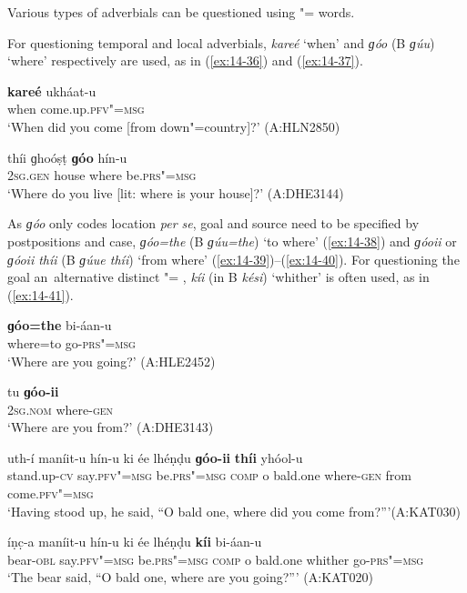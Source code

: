  Various types of adverbials can be questioned using "= words.


For questioning temporal and local adverbials, \textit{kareé} `when' and \textit{ɡóo} (B \textit{ɡúu}) `where' respectively are used, as in (\ref{ex:14-36}) and (\ref{ex:14-37}). 

\begin{exe}
\ex
\label{ex:14-36}
\gll \textbf{kareé} ukháat-u \\
when come.up.\textsc{pfv"=msg} \\
\glt `When did you come [from down"=country]?' (A:HLN2850)

\ex
\label{ex:14-37}
\gll thíi ɡhoóṣṭ \textbf{ɡóo} hín-u \\
\textsc{2sg.gen} house where be.\textsc{prs"=msg} \\
\glt `Where do you live [lit: where is your house]?' (A:DHE3144)
\end{exe}

As \textit{ɡóo} only codes location \textit{per se}, goal and source need to be specified by postpositions and case, \textit{ɡóo=the} (B \textit{ɡúu=the}) `to where' (\ref{ex:14-38}) and \textit{ɡóoii} or \textit{ɡóoii thíi} (B \textit{ɡúue thíi}) `from where' (\ref{ex:14-39})--(\ref{ex:14-40}). For questioning the goal an~alternative distinct "= , \textit{kíi} (in B \textit{kési}) `whither' is often used, as in (\ref{ex:14-41}).

\begin{exe}
\ex
\label{ex:14-38}
\gll \textbf{ɡóo=the} bi-áan-u \\
where=to go-\textsc{prs"=msg } \\
\glt `Where are you going?' (A:HLE2452)

\ex
\label{ex:14-39}
\gll tu \textbf{ɡóo-ii} \\
\textsc{2sg.nom} where-\textsc{gen}  \\
\glt `Where are you from?' (A:DHE3143)

\ex
\label{ex:14-40}
\gll uth-í maníit-u hín-u ki ée lhéṇḍu \textbf{ɡóo-ii} \textbf{thíi} yhóol-u \\
stand.up-\textsc{cv} say.\textsc{pfv"=msg} be.\textsc{prs"=msg} \textsc{comp} o bald.one where-\textsc{gen} from come.\textsc{pfv"=msg} \\
\glt `Having stood up, he said, ``O bald one, where did you come from?'''\newline (A:KAT030)

\ex
\label{ex:14-41}
\gll íṇc̣-a maníit-u hín-u ki ée lhéṇḍu \textbf{kíi} bi-áan-u \\
bear-\textsc{obl} say.\textsc{pfv"=msg} be.\textsc{prs"=msg} \textsc{comp} o bald.one whither go-\textsc{prs"=msg} \\
\glt `The bear said, ``O bald one, where are you going?''' (A:KAT020)
\end{exe}

